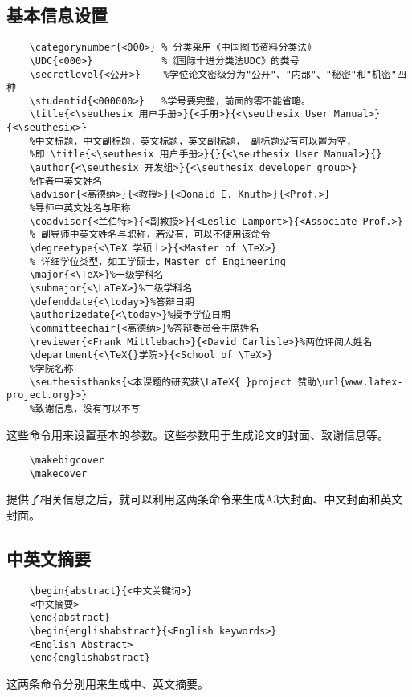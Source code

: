 \documentclass[figurelist,tablelist,algorithmlist,nomlist,masters]{seuthesix}
\begin{document}
\subsection{基本信息设置}
{\color{magenta}
	\begin{verbatim}
	\categorynumber{<000>} % 分类采用《中国图书资料分类法》
	\UDC{<000>}            %《国际十进分类法UDC》的类号
	\secretlevel{<公开>}    %学位论文密级分为"公开"、"内部"、"秘密"和"机密"四种
	\studentid{<000000>}   %学号要完整，前面的零不能省略。
	\title{<\seuthesix 用户手册>}{<手册>}{<\seuthesix User Manual>}{<\seuthesix>}
	%中文标题，中文副标题，英文标题，英文副标题， 副标题没有可以置为空， 
	%即 \title{<\seuthesix 用户手册>}{}{<\seuthesix User Manual>}{}
	\author{<\seuthesix 开发组>}{<\seuthesix developer group>}
	%作者中英文姓名
	\advisor{<高德纳>}{<教授>}{<Donald E. Knuth>}{<Prof.>}
	%导师中英文姓名与职称
	\coadvisor{<兰伯特>}{<副教授>}{<Leslie Lamport>}{<Associate Prof.>} 
	% 副导师中英文姓名与职称，若没有，可以不使用该命令
	\degreetype{<\TeX 学硕士>}{<Master of \TeX>} 
	% 详细学位类型，如工学硕士，Master of Engineering
	\major{<\TeX>}%一级学科名
	\submajor{<\LaTeX>}%二级学科名
	\defenddate{<\today>}%答辩日期
	\authorizedate{<\today>}%授予学位日期
	\committeechair{<高德纳>}%答辩委员会主席姓名
	\reviewer{<Frank Mittlebach>}{<David Carlisle>}%两位评阅人姓名
	\department{<\TeX{}学院>}{<School of \TeX>}
	%学院名称
	\seuthesisthanks{<本课题的研究获\LaTeX{ }project 赞助\url{www.latex-project.org}>}
	%致谢信息，没有可以不写
	\end{verbatim}
}
这些命令用来设置基本的参数。这些参数用于生成论文的封面、致谢信息等。


{\color{magenta}
	\begin{verbatim}
	\makebigcover
	\makecover
	\end{verbatim}
}
提供了相关信息之后，就可以利用这两条命令来生成A3大封面、中文封面和英文封面。


\subsection{中英文摘要}
{\color{magenta}
	\begin{verbatim}
	\begin{abstract}{<中文关键词>}
	<中文摘要>
	\end{abstract}
	\begin{englishabstract}{<English keywords>}
	<English Abstract>
	\end{englishabstract}
	\end{verbatim}
}
这两条命令分别用来生成中、英文摘要。
\end{document}
